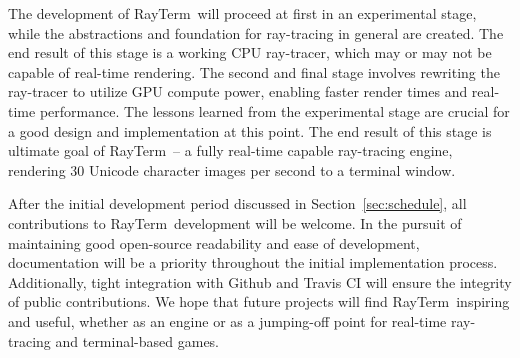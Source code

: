 \documentclass[11pt]{article}
\newcommand{\name}{{\sc RayTerm}}
\begin{document}
The development of \name\ will proceed at first in an experimental stage, while the abstractions and foundation for ray-tracing in general are created.
The end result of this stage is a working CPU ray-tracer, which may or may not be capable of real-time rendering.
The second and final stage involves rewriting the ray-tracer to utilize GPU compute power, enabling faster render times and real-time performance.
The lessons learned from the experimental stage are crucial for a good design and implementation at this point.
The end result of this stage is ultimate goal of \name\ -- a fully real-time capable ray-tracing engine, rendering 30 Unicode character images per second to a terminal window.

After the initial development period discussed in Section~\ref{sec:schedule}, all contributions to \name\ development will be welcome.
In the pursuit of maintaining good open-source readability and ease of development, documentation will be a priority throughout the initial implementation process.
Additionally, tight integration with Github and Travis CI will ensure the integrity of public contributions.
We hope that future projects will find \name\ inspiring and useful, whether as an engine or as a jumping-off point for real-time ray-tracing and terminal-based games.




\end{document}
